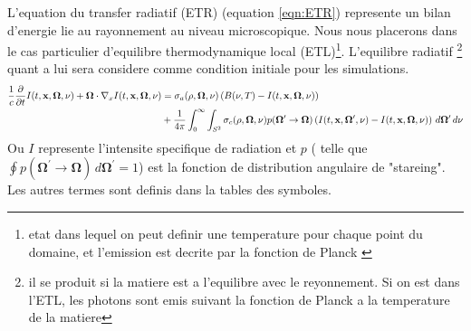 L'equation du transfer radiatif (ETR) (equation \ref{eqn:ETR}) represente un bilan d'energie lie au rayonnement au niveau microscopique. Nous nous placerons dans le cas particulier d'equilibre thermodynamique local (ETL)\footnote{etat dans lequel on peut definir une temperature pour chaque point du domaine, et l'emission est decrite par la fonction de Planck \parencite{Reference3}}. L'equilibre radiatif \footnote{il se produit si la matiere est a l'equilibre avec le reyonnement. Si on est dans l'ETL, les photons sont emis suivant la fonction de Planck a la temperature de la matiere} quant a lui sera considere comme condition initiale pour les simulations.
\begingroup
\footnotesize
\begin{gather}
    \begin{aligned}
    \frac{1}{c} \frac{\partial}{\partial t}I(t,\mathbf{x},\bm{\Omega},\nu)+\bm{\Omega}\cdot\nabla_x I(t,\mathbf{x},\bm{\Omega},\nu)
    &= \sigma_a(\rho,\bm{\Omega},\nu)\left(B(\nu,T)-I(t,\mathbf{x},\bm{\Omega},\nu)\right) \\
    &+ \frac{1}{4\pi} \int_{0}^{\infty} \int_{S^2}\sigma_c(\rho,\bm{\Omega},\nu)p(\bm{\Omega}^\prime\rightarrow\bm{\Omega})\left(I(t,\mathbf{x},\bm{\Omega}^\prime,\nu)-I(t,\mathbf{x},\bm{\Omega},\nu)\right) \, d\bm{\Omega}^\prime \, d\nu
    \end{aligned}
\label{eqn:ETR}
\end{gather}
\endgroup
Ou $I$ represente l'intensite specifique de radiation et $p$ ( telle que $\oint p(\bm{\Omega}^\prime\rightarrow\bm{\Omega})\, d\bm{\Omega}^\prime=1$) est la fonction de distribution angulaire de "stareing". Les autres termes sont definis dans la tables des symboles.

